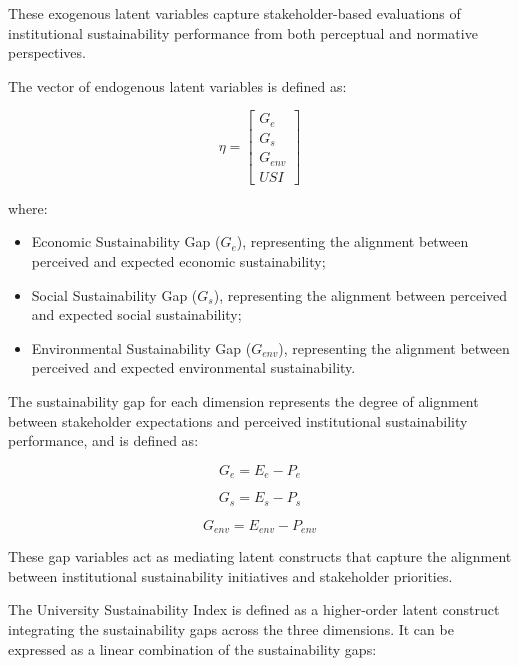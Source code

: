 \documentclass[11pt,a4paper]{article}
\begin{document}
These exogenous latent variables capture stakeholder-based evaluations of institutional sustainability performance from both perceptual and normative perspectives.

The vector of endogenous latent variables is defined as:

\begin{equation}
\eta =
\begin{bmatrix}
G_e \\
G_s \\
G_{env} \\
USI
\end{bmatrix}
\end{equation}

where:

\begin{itemize}
\item Economic Sustainability Gap ($G_e$), representing the alignment between perceived and expected economic sustainability;
\item Social Sustainability Gap ($G_s$), representing the alignment between perceived and expected social sustainability;
\item Environmental Sustainability Gap ($G_{env}$), representing the alignment between perceived and expected environmental sustainability.
\end{itemize}

The sustainability gap for each dimension represents the degree of alignment between stakeholder expectations and perceived institutional sustainability performance, and is defined as:

\begin{equation}
G_e = E_e - P_e
\end{equation}

\begin{equation}
G_s = E_s - P_s
\end{equation}

\begin{equation}
G_{env} = E_{env} - P_{env}
\end{equation}

These gap variables act as mediating latent constructs that capture the alignment between institutional sustainability initiatives and stakeholder priorities.

The University Sustainability Index is defined as a higher-order latent construct integrating the sustainability gaps across the three dimensions. It can be expressed as a linear combination of the sustainability gaps:
\end{document}
